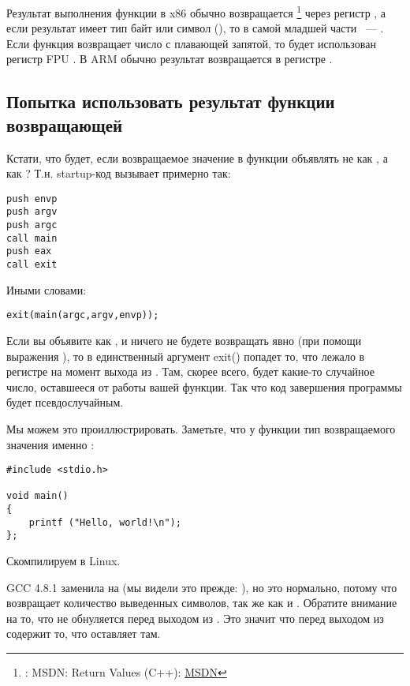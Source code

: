 
Результат выполнения функции в x86 обычно возвращается
\footnote{\Seealso: MSDN: Return Values (C++): \href{http://go.yurichev.com/17258}{MSDN}}
через регистр \EAX, а если результат имеет тип байт или символ (\Tchar), 
то в самой младшей части \EAX~--- \AL. Если функция возвращает число с плавающей запятой, 
то будет использован регистр FPU .
В ARM обычно результат возвращается в регистре .

\subsection{Попытка использовать результат функции возвращающей \Tvoid}
\label{UseResultOfVoidFunc}

Кстати, что будет, если возвращаемое значение в функции \main объявлять не как \Tint, а как \Tvoid?
Т.н. startup-код вызывает \main примерно так:

\begin{lstlisting}[style=customasmx86]
push envp
push argv
push argc
call main
push eax
call exit
\end{lstlisting}

Иными словами:

\begin{lstlisting}[style=customc]
exit(main(argc,argv,envp));
\end{lstlisting}

Если вы объявите \main как \Tvoid, и ничего не будете возвращать явно (при помощи выражения ), то в единственный аргумент exit() попадет то, что лежало в регистре \EAX на момент выхода из \main.
Там, скорее всего, будет какие-то случайное число, оставшееся от работы вашей функции. Так что код завершения программы будет псевдослучайным.

Мы можем это проиллюстрировать.
Заметьте, что у функции \main тип возвращаемого значения именно \Tvoid{}:

\begin{lstlisting}[style=customc]
#include <stdio.h>

void main()
{
	printf ("Hello, world!\n");
};
\end{lstlisting}

Скомпилируем в Linux.

GCC 4.8.1 заменила \printf на \puts 
(мы видели это прежде: ), но это нормально, потому что \puts возвращает количество
выведенных символов, так же как и \printf.
Обратите внимание на то, что \EAX не обнуляется перед выходом из \main.
Это значит что \EAX перед выходом из \main содержит то, что \puts оставляет там.

